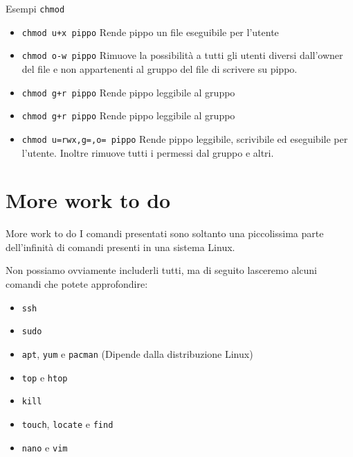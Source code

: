 \documentclass{beamer}
\begin{document}
\begin{frame}{Esempi \texttt{chmod}}
  \begin{itemize}
    \item \texttt{chmod u+x pippo} Rende pippo un file eseguibile per l'utente
    \item \texttt{chmod o-w pippo} Rimuove la possibilità a tutti gli utenti
      diversi dall'owner del file e non appartenenti al gruppo del file di 
      scrivere su pippo.
    \item \texttt{chmod g+r pippo} Rende pippo leggibile al gruppo
    \item \texttt{chmod g+r pippo} Rende pippo leggibile al gruppo
    \item \texttt{chmod u=rwx,g=,o= pippo} Rende pippo leggibile, scrivibile ed
      eseguibile per l'utente. Inoltre rimuove tutti i permessi dal gruppo e 
      altri.
  \end{itemize}
\end{frame}

\section{More work to do}
\begin{frame}{More work to do}
  I comandi presentati sono soltanto una piccolissima parte dell'infinità di 
  comandi presenti in una sistema Linux.\bigskip 

  Non possiamo ovviamente includerli tutti, ma di seguito lasceremo alcuni 
  comandi che potete approfondire:
  \begin{itemize}
    \item \texttt{ssh}
    \item \texttt{sudo}
    \item \texttt{apt}, \texttt{yum} e \texttt{pacman} (Dipende dalla 
      distribuzione Linux)
    \item \texttt{top} e \texttt{htop}
    \item \texttt{kill}
    \item \texttt{touch}, \texttt{locate} e  \texttt{find} 
    \item \texttt{nano} e \texttt{vim}
  \end{itemize}
\end{frame}
    
\end{document}
